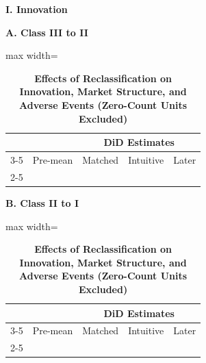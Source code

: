\documentclass[letterpaper,12pt]{article}
\theoremstyle{definition}
\begin{document}
\clearpage
\newpage


\begin{table}[t]
\centering
\caption{\textbf{Effects of Reclassification on Innovation, Market Structure, and Adverse Events (Zero-Count Units Excluded)}}
\label{tab:Combined_DropNoCounts}
\begin{threeparttable}

\noindent\makebox[\textwidth]{\rule{\textwidth}{0.5pt}}

\vspace{-13pt}

\noindent\makebox[\textwidth]{\rule{\textwidth}{0.5pt}}
\textbf{I. Innovation}\par\vspace{4pt}

\begin{minipage}[t]{0.49\textwidth}
\centering\footnotesize
\textbf{A. Class III to II}\par\vspace{2pt}
\begin{adjustbox}{max width=\linewidth}
\begin{tabular}{@{}lcccc@{}}
\toprule
 &  & \multicolumn{3}{c}{DiD Estimates}\\
\cmidrule(lr){3-5}
 & Pre-mean & Matched & Intuitive & Later \\
\cmidrule(lr){2-5}

\bottomrule
\end{tabular}
\end{adjustbox}
\end{minipage}\hfill
\begin{minipage}[t]{0.49\textwidth}
\centering\footnotesize
\textbf{B. Class II to I}\par\vspace{2pt}
\begin{adjustbox}{max width=\linewidth}
\begin{tabular}{@{}lcccc@{}}
\toprule
 &  & \multicolumn{3}{c}{DiD Estimates}\\
\cmidrule(lr){3-5}
 & Pre-mean & Matched & Intuitive & Later \\
\cmidrule(lr){2-5}

\bottomrule
\end{tabular}
\end{adjustbox}
\end{minipage}


\end{threeparttable}
\end{table}
\end{document}
